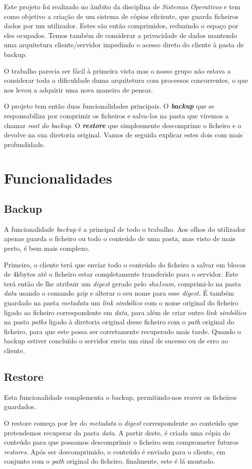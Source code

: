\documentclass[12pt,a4paper]{report}
\begin{document}
Este projeto foi realizado no âmbito da disciplina de \emph{Sistemas Operativos} e tem como objetivo a criação de um sistema de cópias eficiente, que guarda ficheiros dados por um utilizador. Estes são então comprimidos, reduzindo o espaço por eles ocupados. Temos também de considerar a privacidade de dados mantendo uma arquitetura cliente/servidor impedindo o acesso direto do cliente à pasta de backup.\par
O trabalho parecia ser fácil à primeira vista mas o nosso grupo não estava a considerar toda a dificuldade duma arquitetura com processos concorrentes, o que nos levou a adquirir uma nova maneira de pensar.\par
O projeto tem então duas funcionalidades principais. O \emph{\bfseries{backup}} que se responsabiliza por comprimir os ficheiros e salva-los na pasta que viremos a chamar \emph{root do backup}. O \emph{\bfseries{restore}} que simplesmente descomprime o ficheiro e o devolve na sua diretoria original. Vamos de seguida explicar estes dois com mais profundidade.

\chapter{Funcionalidades}
\section{Backup}
A funcionalidade \emph{backup} é a principal de todo o trabalho. Aos olhos do utilizador apenas guarda o ficheiro ou todo o conteúdo de uma pasta, mas visto de mais perto, é bem mais complexo.\par Primeiro, o cliente terá que enviar todo o conteúdo do ficheiro a salvar em blocos de 4kbytes até o ficheiro estar completamente transferido para o servidor. Este terá então de lhe atribuir um \emph{digest} gerado pelo \emph{sha1sum}, comprimi-lo na pasta \emph{data}  usando o comando \emph{gzip} e alterar o seu nome para esse \emph{digest}. É também guardado na pasta \emph{metadata} um \emph{link simbólico} com o nome original do ficheiro ligado ao ficheiro correspondente em \emph{data}, para além de criar outro \emph{link simbólico} na pasta \emph{paths} ligado à diretoria original desse ficheiro com o \emph{path} original do ficheiro, para que este possa ser corretamente recuperado mais tarde. Quando o backup estiver concluído o servidor envia um sinal de sucesso ou de erro ao cliente.

\section{Restore}
Esta funcionalidade complementa o backup, permitindo-nos reaver os ficheiros guardados.\par O restore começa por ler do \emph{metadata} o \emph{digest} correspondente ao conteúdo que pretendemos recuperar da pasta \emph{data}. A partir deste, é criada uma cópia do conteúdo para que possamos descomprimir o ficheiro sem comprometer futuros \emph{restores}. Após ser descomprimido, o conteúdo é enviado para o cliente, em conjunto com o \emph{path} original do ficheiro, finalmente, este é lá montado.
\end{document}
